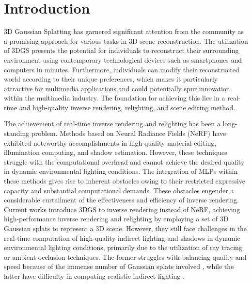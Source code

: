 \section{Introduction}
\label{sec:intro}
3D Gaussian Splatting \cite{3dgs} has garnered significant attention from the community as a promising approach for various tasks in 3D scene reconstruction. 
The utilization of 3DGS presents the potential for individuals to reconstruct their surrounding environment using contemporary technological devices such as smartphones and computers in minutes. Furthermore, individuals can modify their reconstructed world according to their unique preferences, which makes it particularly attractive for multimedia applications and could potentially spur innovation within the multimedia industry. The foundation for achieving this lies in a real-time and high-quality inverse rendering, relighting, and scene editing method. 

The achievement of real-time inverse rendering and relighting has been a long-standing problem. Methods based on Neural Radiance Fields (NeRF) \cite{jin2023tensoir,munkberg2022NVDiffrec,zhang2021nerfactor} have exhibited noteworthy accomplishments in high-quality material editing, illumination computing, and shadow estimation. However, these techniques struggle with the computational overhead and cannot achieve the desired quality in dynamic environmental lighting conditions. The integration of MLPs within these methods gives rise to inherent obstacles owing to their restricted expressive capacity and substantial computational demands. These obstacles engender a considerable curtailment of the effectiveness and efficiency of inverse rendering. Current works \cite{shi2023gir,liang2023gsir,gao2023relightable} introduce 3DGS to inverse rendering instead of NeRF, achieving high-performance inverse rendering and relighting by employing a set of 3D Gaussian splats to represent a 3D scene. However, they still face challenges in the real-time computation of high-quality indirect lighting and shadows in dynamic environmental lighting conditions, primarily due to the utilization of ray tracing or ambient occlusion techniques. The former struggles with balancing quality and speed because of the immense number of Gaussian splats involved \cite{gao2023relightable}, while the latter have difficulty in computing realistic indirect lighting \cite{liang2023gsir}. 

